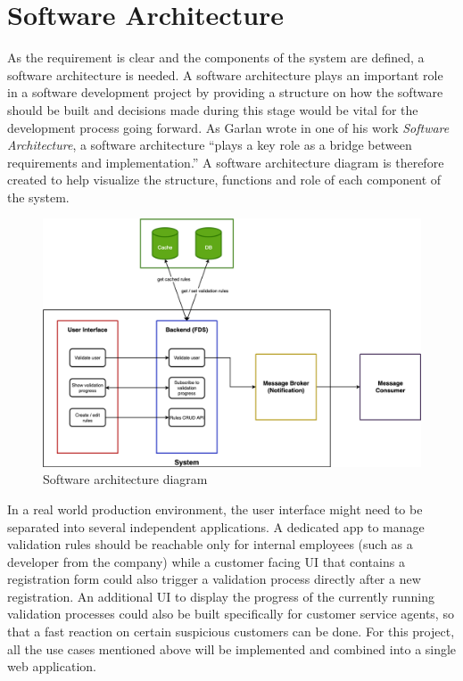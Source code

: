 \section{Software Architecture}
 \label{section:sw-arc}

As the requirement is clear and the components of the system are defined, a software architecture is needed. A software architecture plays an important role in a software development project by providing a structure on how the software should be built and decisions made during this stage would be vital for the development process going forward. As Garlan wrote in one of his work \emph{Software Architecture}, a software architecture \enquote{plays a key role as a bridge between requirements and implementation.}\autocite{garlan-2000} A software architecture diagram is therefore created to help visualize the structure, functions and role of each component of the system.

\begin{figure}[h]
 \includegraphics[width=\textwidth]{diagrams/sw-architecture.png}
 \caption{Software architecture diagram}
 \label{fig:sw-arc}
\end{figure}

In a real world production environment, the user interface might need to be separated into several independent applications. A dedicated app to manage validation rules should be reachable only for internal employees (such as a developer from the company) while a customer facing UI that contains a registration form could also trigger a validation process directly after a new registration. An additional UI to display the progress of the currently running validation processes could also be built specifically for customer service agents, so that a fast reaction on certain suspicious customers can be done. For this project, all the use cases mentioned above will be implemented and combined into a single web application. 

